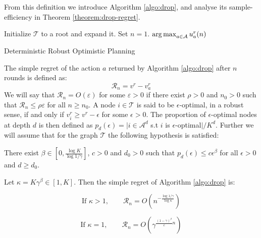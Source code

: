 \documentclass{article}
\begin{document}
From this definition we introduce Algorithm \ref{algo:drop}, and analyse its sample-efficiency in Theorem \ref{theorem:drop-regret}.

\begin{algorithm}[tp]
\DontPrintSemicolon
Initialize $\mathcal{T}$ to a root and expand it. Set $n=1$.\;
\Return $\operatorname*{arg\,max}_{a\in \mathcal{A}} u^r_a(n)$
\caption{Deterministic Robust Optimistic Planning}
\label{algo:drop}
\end{algorithm}

The simple regret of the action $a$ returned by Algorithm \ref{algo:drop} after $n$ rounds is defined as:
\begin{equation}
\mathcal{R}_n = v^r - v_a^r
\end{equation}
We will say that $\mathcal{R}_n=O(\varepsilon)$ for some $\varepsilon>0$ if there exist $\rho>0$ and $n_0>0$ such that $\mathcal{R}_n\leq\rho\varepsilon$ for all $n\geq n_0$.
A node $i\in\mathcal{T}$ is said to be $\epsilon$-optimal, in a robust sense, if and only if $v_i^r \geq v^r - \epsilon$ for some $\epsilon > 0$. The proportion of $\epsilon$-optimal nodes at depth $d$ is then defined as $p_d(\epsilon) = |i \in \mathcal{A}^d$ s.t $i$ is $\epsilon$-optimal$|/K^d$. Further we will assume that for the graph $\mathcal{T}$ the following hypothesis is satisfied:
\begin{assumption}
\label{assumpt:beta}
There exist $\beta\in[0, \frac{\log K}{\log 1/\gamma}]$, $c > 0$ and $d_0 > 0$ such that $p_d(\epsilon)\leq c\epsilon^\beta$ for all $\epsilon > 0$ and $d\geq d_0$.
\end{assumption}

\begin{theorem}
\label{theorem:drop-regret}
Let $\kappa = K\gamma^\beta \in [1, K]$. Then the simple regret of Algorithm \ref{algo:drop} is:


\begin{equation}
\text{If } \kappa>1,\qquad 
\mathcal{R}_n = O\left(n^{-\frac{\log 1/\gamma}{\log \kappa}}\right)
\end{equation}

\begin{equation}
\text{If }\kappa=1,\qquad
\mathcal{R}_n = O\left(\gamma^{\frac{(1-\gamma)^\beta}{c}n}\right)
\end{equation}
\end{theorem}
\end{document}
